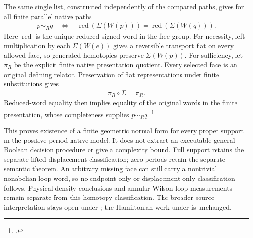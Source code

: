 \documentclass{article}
\begin{document}
The same single list, constructed independently of the compared paths,
gives for all finite parallel native paths
\begin{align}
    p\sim_Rq
    \quad\Longleftrightarrow\quad
    \operatorname{red}(\Sigma(W(p)))
    =\operatorname{red}(\Sigma(W(q))).
    \label{eq:scp10_proper_support_normal_form}
\end{align}
Here $\operatorname{red}$ is the unique reduced signed word in the free group.
For necessity, left multiplication by each $\Sigma(W(e))$ gives a reversible
transport flat on every allowed face, so generated homotopies preserve
$\Sigma(W(p))$. For sufficiency, let $\pi_R$ be the explicit finite native
presentation quotient. Every selected face is an original defining relator.
Preservation of flat representations under finite substitutions gives
\begin{align}
    \pi_R\circ\Sigma=\pi_R.
    \label{eq:scp10_proper_support_quotient}
\end{align}
Reduced-word equality then implies equality of the original words in the
finite presentation, whose completeness supplies $p\sim_Rq$.
\footnote{.}

This proves existence of a finite geometric normal form for every proper
support in the positive-period native model. It does not extract an executable
general Boolean decision procedure or give a complexity bound. Full support
retains the separate lifted-displacement classification; zero periods retain
the separate semantic theorem. An arbitrary missing face can still carry a
nontrivial nonabelian loop word, so no endpoint-only or displacement-only
classification follows. Physical density conclusions and annular Wilson-loop
measurements remain separate from this homotopy classification.
The broader source interpretation stays open under ;
the Hamiltonian work under  is unchanged.



\end{document}
